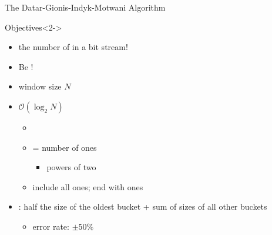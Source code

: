 \begin{frame}{The Datar-Gionis-Indyk-Motwani Algorithm}
	\begin{block}{Objectives}<2->
		\begin{itemize}
			\item<3->
			 the number of  in a bit stream!

			\item<4->
			Be !
		\end{itemize}
	\end{block}
	\begin{itemize}
		\item<5->
		window size $N$

		\item<6->
		$\mathcal{O}(\log_2 N)$ 
		\begin{itemize}
			\item<8->

			\item<9->
			 = number of ones
			\begin{itemize}
				\item<10->
				powers of two
%
			\end{itemize}

			\item<11->
			include all ones; end with ones
		\end{itemize}
	
		\item<12->
		: half the size of the oldest bucket + sum of sizes of all other buckets
		\begin{itemize}
			\item<15->
			error rate: $\pm50\%$
		\end{itemize}
	

\end{itemize}
\end{frame}
